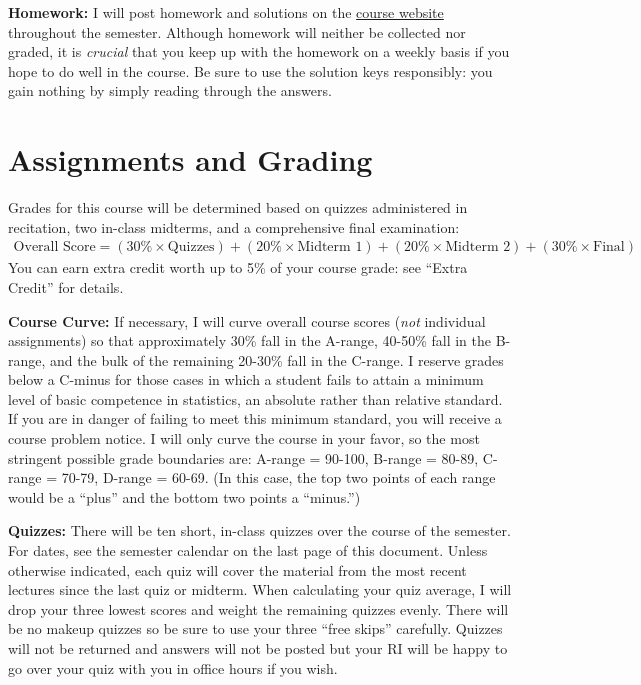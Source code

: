 \documentclass[11pt, letterpaper]{article}
\begin{document}
\medskip

\noindent \textbf{Homework:} 
I will post homework and solutions on the \href{http://ditraglia.com/Econ103Public}{course website} throughout the semester. 
Although homework will neither be collected nor graded, it is \emph{crucial} that you keep up with the homework on a weekly basis if you hope to do well in the course.
Be sure to use the solution keys responsibly: you gain nothing by simply reading through the answers.



\section*{Assignments and Grading}

Grades for this course will be determined based on quizzes administered in recitation, two in-class midterms, and a comprehensive final examination:
	\begin{equation*}
	\begin{split}
		\mbox{Overall Score} = (30\% \times \mbox{Quizzes})  + (20\% \times \mbox{Midterm 1}) + (20\% \times \mbox{Midterm 2}) + (30\% \times \mbox{Final})
	\end{split}
	\end{equation*}
You can earn extra credit worth up to 5\% of your course grade: see ``Extra Credit'' for details.

\medskip 

\noindent \textbf{Course Curve:}
If necessary, I will curve overall course scores (\emph{not} individual assignments) so that approximately 30\% fall in the A-range, 40-50\% fall in the B-range, and the bulk of the remaining 20-30\% fall in the C-range. 
I reserve grades below a C-minus for those cases in which a student fails to attain a minimum level of basic competence in statistics, an absolute rather than relative standard. 
If you are in danger of failing to meet this minimum standard, you will receive a course problem notice.
I will only curve the course in your favor, so the most stringent possible grade boundaries are: A-range = 90-100, B-range = 80-89, C-range = 70-79, D-range = 60-69.
(In this case, the top two points of each range would be a ``plus'' and the bottom two points a ``minus.'')

\medskip


\noindent \textbf{Quizzes:} 
There will be ten short, in-class quizzes over the course of the semester.
For dates, see the semester calendar on the last page of this document.
Unless otherwise indicated, each quiz will cover the material from the most recent lectures since the last quiz or midterm.
When calculating your quiz average, I will drop your three lowest scores and weight the remaining quizzes evenly. 
There will be no makeup quizzes so be sure to use your three ``free skips'' carefully.
Quizzes will not be returned and answers will not be posted but your RI will be happy to go over your quiz with you in office hours if you wish. 
\end{document}
